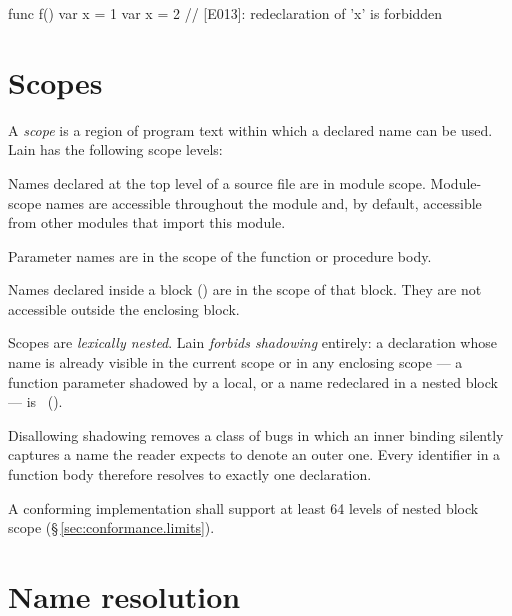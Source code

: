 \begin{example}
\begin{laincode}
func f() {
    var x = 1
    var x = 2   // [E013]: redeclaration of 'x' is forbidden
}
\end{laincode}
\end{example}

\section{Scopes}
\label{sec:basics.scopes}

\pnum
A \textit{scope} is a region of program text within which a declared name
can be used.  Lain has the following scope levels:

\begin{description}[leftmargin=2em]
  \item[Module scope]
    Names declared at the top level of a source file are in module scope.
    Module-scope names are accessible throughout the module and, by
    default, accessible from other modules that import this module.

  \item[Function/procedure scope]
    Parameter names are in the scope of the function or procedure body.

  \item[Block scope]
    Names declared inside a block (\lain{\{ \}}) are in the scope of that
    block.  They are not accessible outside the enclosing block.
\end{description}

\pnum
Scopes are \textit{lexically nested}.  Lain \emph{forbids shadowing}
entirely: a declaration whose name is already visible in the current scope
or in any enclosing scope --- a function parameter shadowed by a local, or a
name redeclared in a nested block --- is \illformed{}~().

\begin{rationale}
  Disallowing shadowing removes a class of bugs in which an inner binding
  silently captures a name the reader expects to denote an outer one.  Every
  identifier in a function body therefore resolves to exactly one
  declaration.
\end{rationale}

\pnum
A conforming implementation shall support at least 64 levels of nested
block scope (\S\,\ref{sec:conformance.limits}).

\section{Name resolution}
\label{sec:basics.resolution}

